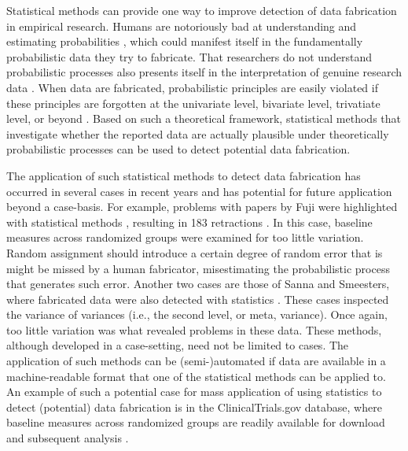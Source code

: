 \documentclass{article}
\begin{document}
Statistical methods can provide one way to improve detection of data fabrication in empirical research. Humans are notoriously bad at understanding and estimating probabilities \citep[e.g.,][]{tversky1974, Tversky1971}, which could manifest itself in the fundamentally probabilistic data they try to fabricate. That researchers do not understand probabilistic processes also presents itself in the interpretation of genuine research data \citep{Hoekstra2006, Sijtsma2015-ts, Goodman_1999}. When data are fabricated, probabilistic principles are easily violated if these principles are forgotten at the univariate level, bivariate level, trivatiate level, or beyond \citep{Haldane1948-nm}. Based on such a theoretical framework, statistical methods that investigate whether the reported data are actually plausible under theoretically probabilistic processes can be used to detect potential data fabrication. 

The application of such statistical methods to detect data fabrication has occurred in several cases in recent years and has potential for future application beyond a case-basis. For example, problems with papers by Fuji were highlighted with statistical methods \citep{Carlisle2012-yg,Carlisle2015-wm}, resulting in 183 retractions \citep{oransky2015}. In this case, baseline measures across randomized groups were examined for too little variation. Random assignment should introduce a certain degree of random error that is might be missed by a human fabricator, misestimating the probabilistic process that generates such error. Another two cases are those of Sanna and Smeesters, where fabricated data were also detected with statistics \citep{simonsohn2013}. These cases inspected the variance of variances (i.e., the second level, or meta, variance). Once again, too little variation was what revealed problems in these data. These methods, although developed in a case-setting, need not be limited to cases. The application of such methods can be (semi-)automated if data are available in a machine-readable format that one of the statistical methods can be applied to. An example of such a potential case for mass application of using statistics to detect (potential) data fabrication is in the ClinicalTrials.gov database, where baseline measures across randomized groups are readily available for download and subsequent analysis \citep{Hartgerink2015-bm}.
\end{document}
